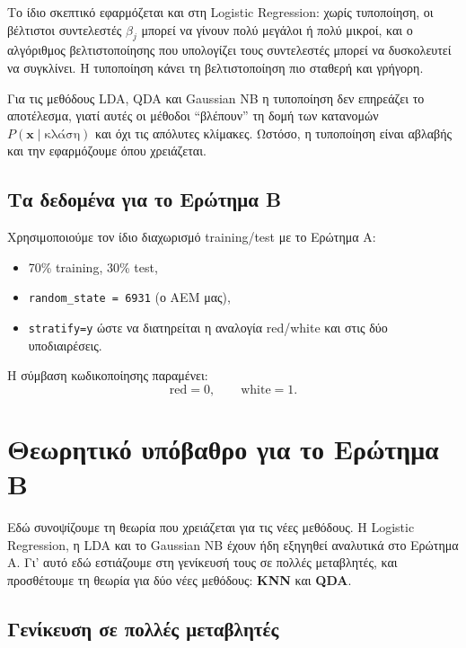 \documentclass[11pt,a4paper]{article}
\newcommand{\code}[1]{\texttt{#1}}
\begin{document}
Το ίδιο σκεπτικό εφαρμόζεται και στη Logistic Regression: χωρίς
τυποποίηση, οι βέλτιστοι συντελεστές \(\beta_j\) μπορεί να γίνουν πολύ
μεγάλοι ή πολύ μικροί, και ο αλγόριθμος βελτιστοποίησης που υπολογίζει
τους συντελεστές μπορεί να δυσκολευτεί να συγκλίνει. Η τυποποίηση κάνει
τη βελτιστοποίηση πιο σταθερή και γρήγορη.

Για τις μεθόδους LDA, QDA και Gaussian NB η τυποποίηση δεν επηρεάζει το
αποτέλεσμα, γιατί αυτές οι μέθοδοι ``βλέπουν'' τη δομή των κατανομών
\(P(\mathbf{x} \mid \text{κλάση})\) και όχι τις απόλυτες κλίμακες.
Ωστόσο, η τυποποίηση είναι αβλαβής και την εφαρμόζουμε όπου χρειάζεται.

\subsection{Τα δεδομένα για το Ερώτημα Β}

Χρησιμοποιούμε τον ίδιο διαχωρισμό training/test με το Ερώτημα Α:
\begin{itemize}
    \item 70\% training, 30\% test,
    \item \code{random\_state = 6931} (ο ΑΕΜ μας),
    \item \code{stratify=y} ώστε να διατηρείται η αναλογία red/white και
    στις δύο υποδιαιρέσεις.
\end{itemize}
Η σύμβαση κωδικοποίησης παραμένει:
\[
\text{red} = 0, \qquad \text{white} = 1.
\]

\section{Θεωρητικό υπόβαθρο για το Ερώτημα Β}

Εδώ συνοψίζουμε τη θεωρία που χρειάζεται για τις νέες μεθόδους. Η
Logistic Regression, η LDA και το Gaussian NB έχουν ήδη εξηγηθεί
αναλυτικά στο Ερώτημα Α. Γι' αυτό εδώ εστιάζουμε στη γενίκευσή τους σε
πολλές μεταβλητές, και προσθέτουμε τη θεωρία για δύο νέες μεθόδους:
\textbf{KNN} και \textbf{QDA}.

\subsection{Γενίκευση σε πολλές μεταβλητές}
\end{document}

